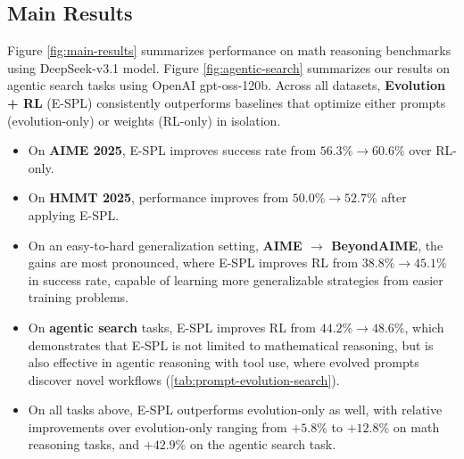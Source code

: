 \documentclass{article}
\theoremstyle{plain}
\theoremstyle{definition}
\theoremstyle{remark}
\begin{document}
\vspace{-8pt}
\subsection{Main Results}

Figure \ref{fig:main-results} summarizes performance on math reasoning benchmarks using DeepSeek-v3.1 model. Figure \ref{fig:agentic-search} summarizes our results on agentic search tasks using OpenAI gpt-oss-120b. Across all datasets, \textbf{Evolution + RL} (E-SPL) consistently outperforms baselines that optimize either prompts (evolution-only) or weights (RL-only) in isolation.
\vspace{-5pt}
\begin{itemize}
    \item On \textbf{AIME 2025}, E-SPL improves success rate from ${56.3\% \rightarrow 60.6\%}$ over RL-only.
    \item On \textbf{HMMT 2025}, performance improves from ${50.0\% \rightarrow 52.7\%}$ after applying E-SPL.
    \item On an easy-to-hard generalization \citep{easy-to-hard} setting, \textbf{AIME $\rightarrow$ BeyondAIME}, the gains are most pronounced, where E-SPL improves RL from ${38.8\%\rightarrow45.1\%}$ in success rate, capable of learning more generalizable strategies from easier training problems.
    \item On \textbf{agentic search} tasks, E-SPL improves RL from $44.2\% \rightarrow 48.6\%$, which demonstrates that E-SPL is not limited to mathematical reasoning, but is also effective in agentic reasoning with tool use, where evolved prompts discover novel workflows (\autoref{tab:prompt-evolution-search}).
    \item On all tasks above, E-SPL outperforms evolution-only as well, with relative improvements over evolution-only ranging from $+5.8\%$ to $+12.8\%$ on math reasoning tasks, and $+42.9\%$ on the agentic search task.
\end{itemize}
\vspace{-5pt}
\end{document}
